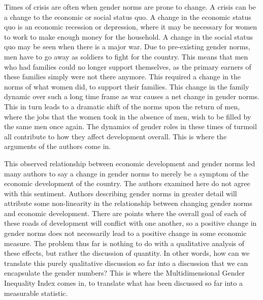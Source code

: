 \documentclass[12pt, letterpaper]{article}
\begin{document}
Times of crisis are often when gender norms are prone to change. A crisis can be a change to the economic or social status quo. A change in the economic status quo is an economic recession or depression, where it may be necessary for women to work to make enough money for the household. A change in the social status quo may be seen when there is a major war. Due to pre-existing gender norms, men have to go away as soldiers to fight for the country. This means that men who had families could no longer support themselves, as the primary earners of these families simply were not there anymore. This required a change in the norms of what women did, to support their families. This change in the family dynamic over such a long time frame as war causes a net change in gender norms. This in turn leads to a dramatic shift of the norms upon the return of men, where the jobs that the women took in the absence of men, wish to be filled by the same men once again. The dynamics of gender roles in these times of turmoil all contribute to how they affect development overall. This is where the arguments of the authors come in. 

This observed relationship between economic development and gender norms led many authors to say a change in gender norms to merely be a symptom of the economic development of the country. The authors examined here do not agree with this sentiment. Authors describing gender norms in greater detail will attribute some non-linearity in the relationship between changing gender norms and economic development. There are points where the overall goal of each of these roads of development will conflict with one another, so a positive change in gender norms does not necessarily lead to a positive change in some economic measure. The problem thus far is nothing to do with a qualitative analysis of these effects, but rather the discussion of quantity. In other words, how can we translate this purely qualitative discussion so far into a discussion that we can encapsulate the gender numbers? This is where the Multidimensional Gender Inequality Index comes in, to translate what has been discussed so far into a measurable statistic.
\end{document}
